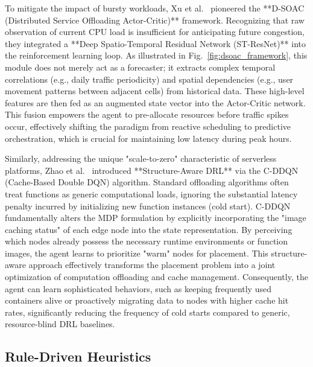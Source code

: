 \documentclass[lettersize,journal]{IEEEtran}
\begin{document}
To mitigate the impact of bursty workloads, Xu et al.~\cite{xu2021DSOAC} pioneered the **D-SOAC (Distributed Service Offloading Actor-Critic)** framework. Recognizing that raw observation of current CPU load is insufficient for anticipating future congestion, they integrated a **Deep Spatio-Temporal Residual Network (ST-ResNet)** into the reinforcement learning loop. As illustrated in Fig.~\ref{fig:dsoac_framework}, this module does not merely act as a forecaster; it extracts complex temporal correlations (e.g., daily traffic periodicity) and spatial dependencies (e.g., user movement patterns between adjacent cells) from historical data. These high-level features are then fed as an augmented state vector into the Actor-Critic network. This fusion empowers the agent to pre-allocate resources before traffic spikes occur, effectively shifting the paradigm from reactive scheduling to predictive orchestration, which is crucial for maintaining low latency during peak hours.

Similarly, addressing the unique "scale-to-zero" characteristic of serverless platforms, Zhao et al.~\cite{zhao2024Cache} introduced **Structure-Aware DRL** via the C-DDQN (Cache-Based Double DQN) algorithm. Standard offloading algorithms often treat functions as generic computational loads, ignoring the substantial latency penalty incurred by initializing new function instances (cold start). C-DDQN fundamentally alters the MDP formulation by explicitly incorporating the "image caching status" of each edge node into the state representation. By perceiving which nodes already possess the necessary runtime environments or function images, the agent learns to prioritize "warm" nodes for placement. This structure-aware approach effectively transforms the placement problem into a joint optimization of computation offloading and cache management. Consequently, the agent can learn sophisticated behaviors, such as keeping frequently used containers alive or proactively migrating data to nodes with higher cache hit rates, significantly reducing the frequency of cold starts compared to generic, resource-blind DRL baselines.

\subsection{Rule-Driven Heuristics}
\label{sec:heuristics}
\end{document}
